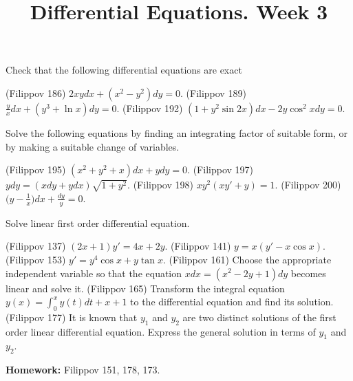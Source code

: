 \documentclass[14pt]{exam}
\title{Differential Equations. Week 3}
\date{}
\begin{document}
	\maketitle
	
	Check that the following differential equations are exact
	\begin{questions}
		\question (Filippov 186) $2xydx + (x^2 - y^2)dy = 0$.
		\question (Filippov 189) $\frac{y}{x} dx + (y^3 + \ln x)dy = 0$.
		\question (Filippov 192) $(1 + y^2\sin 2x)dx - 2y \cos^2 x dy = 0$.
	\end{questions}
	
	Solve the following equations by finding an integrating factor of suitable form, or by making a suitable change of variables.
	\begin{questions}
		\setcounter{question}{3}
		\question (Filippov 195) $(x^2 + y^2 + x)dx + ydy = 0$.
		\question (Filippov 197) $ydy = (xdy + ydx) \sqrt{1 + y^2}$.
		\question (Filippov 198) $xy^2(xy' + y) = 1$.
		\question (Filippov 200) $\bigr(y - \frac{1}{x}\bigr)dx + \frac{dy}{y} = 0$.
	\end{questions}
	
	Solve linear first order differential equation.
	\begin{questions}
		\setcounter{question}{7}
		\question (Filippov 137) $(2x + 1)y' = 4x + 2y$.
		\question (Filippov 141) $y = x(y' - x \cos x)$.
		\question (Filippov 153) $y' = y^4\cos x + y \tan x$.
		\question (Filippov 161) Choose the appropriate independent variable so that the equation $xdx = (x^2 - 2y + 1)dy$ becomes linear and solve it.
		\question (Filippov 165) Transform the integral equation $y(x) = \int_0^xy(t)dt + x + 1$ to the differential equation and find its solution.
		\question (Filippov 177) It is known that $y_1$ and $y_2$ are two distinct solutions of the first order linear differential equation. Express the general solution in terms of $y_1$ and $y_2$. 
	\end{questions}
	\textbf{Homework:} Filippov 151, 178, 173.
\end{document}
